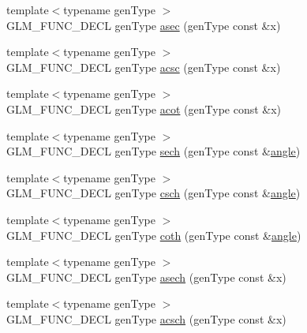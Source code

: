 \begin{DoxyCompactItemize}
\item 
{\footnotesize template$<$typename gen\-Type $>$ }\\G\-L\-M\-\_\-\-F\-U\-N\-C\-\_\-\-D\-E\-C\-L gen\-Type \hyperlink{group__gtc__reciprocal_gac9761980e09149002a466ca131a4bcac}{asec} (gen\-Type const \&x)
\item 
{\footnotesize template$<$typename gen\-Type $>$ }\\G\-L\-M\-\_\-\-F\-U\-N\-C\-\_\-\-D\-E\-C\-L gen\-Type \hyperlink{group__gtc__reciprocal_ga135e8f6b36bb85b5f7d8067e6b890e4d}{acsc} (gen\-Type const \&x)
\item 
{\footnotesize template$<$typename gen\-Type $>$ }\\G\-L\-M\-\_\-\-F\-U\-N\-C\-\_\-\-D\-E\-C\-L gen\-Type \hyperlink{group__gtc__reciprocal_ga97d029f989f849b62915b068c264246b}{acot} (gen\-Type const \&x)
\item 
{\footnotesize template$<$typename gen\-Type $>$ }\\G\-L\-M\-\_\-\-F\-U\-N\-C\-\_\-\-D\-E\-C\-L gen\-Type \hyperlink{group__gtc__reciprocal_gaaa698b992c63f454a3a1a1baa2773a3c}{sech} (gen\-Type const \&\hyperlink{group__gtc__quaternion_ga23a3fc7ada5bbb665ff84c92c6e0542c}{angle})
\item 
{\footnotesize template$<$typename gen\-Type $>$ }\\G\-L\-M\-\_\-\-F\-U\-N\-C\-\_\-\-D\-E\-C\-L gen\-Type \hyperlink{group__gtc__reciprocal_ga00404a9cdf62023792d1d0afedd7f896}{csch} (gen\-Type const \&\hyperlink{group__gtc__quaternion_ga23a3fc7ada5bbb665ff84c92c6e0542c}{angle})
\item 
{\footnotesize template$<$typename gen\-Type $>$ }\\G\-L\-M\-\_\-\-F\-U\-N\-C\-\_\-\-D\-E\-C\-L gen\-Type \hyperlink{group__gtc__reciprocal_gae2f1e6f7c360dda452b88e0c492d6f4d}{coth} (gen\-Type const \&\hyperlink{group__gtc__quaternion_ga23a3fc7ada5bbb665ff84c92c6e0542c}{angle})
\item 
{\footnotesize template$<$typename gen\-Type $>$ }\\G\-L\-M\-\_\-\-F\-U\-N\-C\-\_\-\-D\-E\-C\-L gen\-Type \hyperlink{group__gtc__reciprocal_ga450f3bf1c04751198994d26d92ac2a63}{asech} (gen\-Type const \&x)
\item 
{\footnotesize template$<$typename gen\-Type $>$ }\\G\-L\-M\-\_\-\-F\-U\-N\-C\-\_\-\-D\-E\-C\-L gen\-Type \hyperlink{group__gtc__reciprocal_ga418b31539e1a69c262712f2c7a4f27eb}{acsch} (gen\-Type const \&x)
\item 

\end{DoxyCompactItemize}
